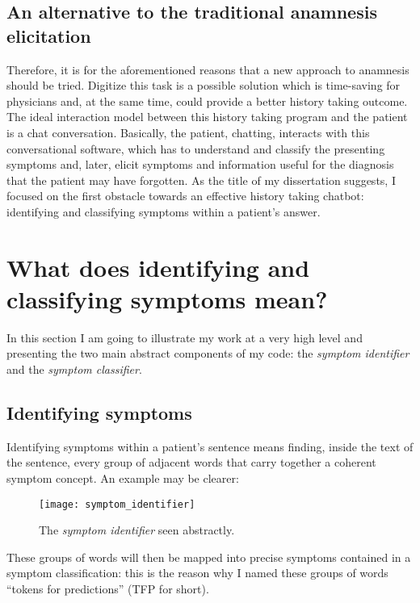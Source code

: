 \subsection{An alternative to the traditional anamnesis elicitation}

Therefore, it is for the aforementioned reasons that a new approach to anamnesis should be tried. Digitize this task is a possible solution which is time-saving for physicians and, at the same time, could provide a better history taking outcome. The ideal interaction model between this history taking program and the patient is a chat conversation. Basically, the patient, chatting, interacts with this conversational software, which has to understand and classify the presenting symptoms and, later, elicit symptoms and information useful for the diagnosis that the patient may have forgotten. As the title of my dissertation suggests, I focused on the first obstacle towards an effective history taking chatbot: identifying and classifying symptoms within a patient’s answer.

\section{What does identifying and classifying symptoms mean?}

In this section I am going to illustrate my work at a very high level and presenting the two main abstract components of my code: the \textit{symptom identifier} and the \textit{symptom classifier}. 

\label{sec:identifying_classifying}
\subsection{Identifying symptoms}

Identifying symptoms within a patient's sentence means finding, inside the text of the sentence, every group of adjacent words that carry together a coherent symptom concept. An example may be clearer:

\begin{figure}[h]
\centering
\texttt{[image: symptom\_identifier]}
\caption{The \textit{symptom identifier} seen abstractly.}
\medskip
\end{figure}

These groups of words will then be mapped into precise symptoms contained in a symptom classification: this is the reason why I named these groups of words “tokens for predictions” (TFP for short).

